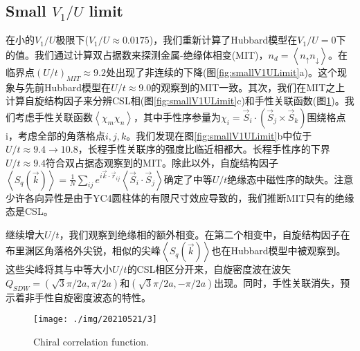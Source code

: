 \documentclass[reprint, aps, prb, showkeys]{revtex4-2}
\begin{document}
\subsection{Small $V_1/U$ limit}
在小的$V_1/U$极限下($V_1/U \approx 0.0175$)，我们重新计算了Hubbard模型在$V_1/U = 0$下的值。我们通过计算双占据数来探测金属-绝缘体相变(MIT)，$n_d = \left\langle n_{\uparrow} n_{\downarrow} \right\rangle$。在临界点$(U/t)_{MIT} \approx 9.2$处出现了非连续的下降(图\ref{fig:smallV1ULimit}a)。这个现象与先前Hubbard模型在$U/t \approx 9.0$的观察到的MIT一致。其次，我们在MIT之上计算自旋结构因子来分辨CSL相(图\ref{fig:smallV1ULimit}c)和手性关联函数(图\ref{fig:chiral})。我们考虑手性关联函数$\left\langle \chi_m \chi_n \right\rangle$，其中手性序参量为$\chi_i = \vec{S}_i \cdot \left( \vec{S}_j \times \vec{S}_k \right)$围绕格点i，考虑全部的角落格点$i,j,k$。我们发现在图\ref{fig:smallV1ULimit}b中位于$U/t \approx 9.4 \to 10.8$，长程手性关联序的强度比临近相都大。长程手性序的下界$U/t \approx 9.4$符合双占据态观察到的MIT。除此以外，自旋结构因子$\left\langle S_q(\vec{k}) \right\rangle = \frac{1}{N} \sum_{ij} e^{i\vec{k} \cdot \vec{r}_{ij}} \left\langle \vec{S}_i \cdot \vec{S}_j \right\rangle$确定了中等$U/t$绝缘态中磁性序的缺失。注意少许各向异性是由于YC4圆柱体的有限尺寸效应导致的，我们推断MIT只有的绝缘态是CSL。

继续增大$U/t$，我们观察到绝缘相的额外相变。在第二个相变中，自旋结构因子在布里渊区角落格外尖锐，相似的尖峰$\left\langle S_q(\vec{k}) \right\rangle$也在Hubbard模型中被观察到。这些尖峰将其与中等大小$U/t$的CSL相区分开来，自旋密度波在波矢$Q_{SDW} = (\sqrt{3}\pi/2a, \pi/2a)$和$(\sqrt{3}\pi/2a,-\pi/2a)$出现。同时，手性关联消失，预示着非手性自旋密度波态的特性。
\begin{figure}[t]
    \texttt{[image: ./img/20210521/3]}
    \caption{\label{fig:chiral} 
    Chiral correlation function.
    }
\end{figure}
\end{document}
